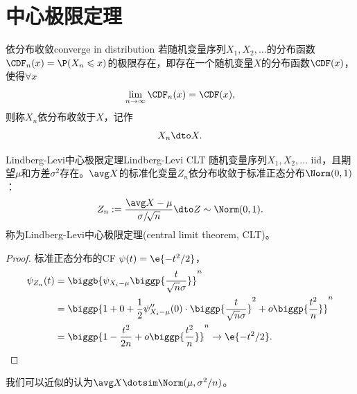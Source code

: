 \section{中心极限定理}

\begin{definition}
	{依分布收敛}{converge in distribution}
	若随机变量序列$X_1,X_2,\ldots$的分布函数$\CDF_n(x)=\P(X_n\leqslant x)$的极限存在，即存在一个随机变量$X$的分布函数$\CDF(x)$，使得$\forall x$
	\[
		\lim_{n\to\infty}\CDF_n(x)=\CDF(x),
	\]
	则称$X_n$依分布收敛于$X$，记作
	\begin{equation}
		X_n\dto X.
	\end{equation}
\end{definition}

\begin{theorem}{Lindberg-Levi中心极限定理}{Lindberg-Levi CLT}
	随机变量序列$X_1, X_2,\ldots$ iid，且期望$\mu$和方差$\sigma^2$存在。$\avg X$的标准化变量$Z_n$依分布收敛于标准正态分布$\Norm(0,1)$：
	\begin{equation}
		Z_n:=\frac{\avg X-\mu}{\sigma/\!\sqrt n}%
		\dto Z\sim\Norm(0,1).
	\end{equation}
	称为Lindberg-Levi中心极限定理(central limit theorem, CLT)。
\end{theorem}
\begin{proof}
	标准正态分布的CF $\psi(t)=\e{-t^2/2}$，%
	\begin{align*}
		\psi_{Z_n}(t)&=\biggb{\psi_{X_i-\mu}\biggp{\frac{t}{\sqrt n\sigma}}}^n\\
		&=\biggp{1+0+\frac12\psi''_{X_i-\mu}(0)\cdot\biggp{\frac{t}{\sqrt n\sigma}}^2+o\biggp{\frac{t^2}n}}^n\\
		&=\biggp{1-\frac{t^2}{2n}+o\biggp{\frac{t^2}n}}^n\to\e{-t^2/2}.
		\qedhere
	\end{align*}
\end{proof}

\begin{corollary}
	我们可以近似的认为$\avg X\dotsim\Norm(\mu,\sigma^2/n)$。
\end{corollary}

